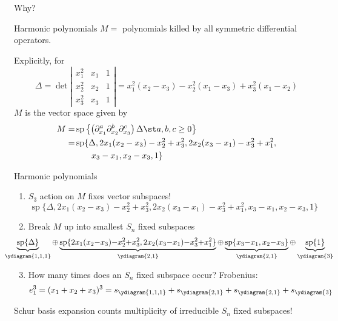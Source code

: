 \documentclass{beamer}
\renewcommand{\Span}{\operatorname{sp}}
\begin{document}
\begin{frame}{Why?}
  \begin{block}{Harmonic polynomials}
   \(M =\) polynomials killed by all symmetric differential
   operators.
  \end{block}\pause
  Explicitly, for
   \[
     \Delta = \det \left|
       \begin{matrix}
         x_1^2 & x_1 & 1\\
         x_2^2 & x_2 & 1\\
         x_3^2 & x_3 & 1
       \end{matrix}
     \right| = x_1^2(x_2-x_3) - x_2^2 (x_1 - x_3) + x_3^2(x_1-x_2)
   \]\pause
   \(M\) is the vector space given by\pause
   \begin{align*}
       M  = & \Span\left\{
\left(           \partial_{x_1}^a
           \partial_{x_2}^b  \partial_{x_3}^c
\right)         \Delta \st a,b,c \geq 0\right\} \\
        = & \Span\{\Delta, 2x_1(x_2-x_3)-x_2^2+x_3^2,
            2x_2(x_3-x_1)-x_3^2+x_1^2, \\
       & \phantom{\Span\{\}}x_3-x_1, x_2-x_3,1\}
   \end{align*}
\end{frame}
\begin{frame}{Harmonic polynomials}
  \begin{enumerate}
  \item \(S_3\) action on \(M\) fixes vector subspaces!
  \[
\Span\{\Delta, 2x_1(x_2-x_3)-x_2^2+x_3^2,
            2x_2(x_3-x_1)-x_3^2+x_1^2, 
       x_3-x_1, x_2-x_3,1\}
  \]\pause 
\item Break \(M\) up into smallest \(S_n\) fixed subspaces \pause
  \[
    \hspace{-2.9em}
    \scalebox{0.95}{\(
      \underbrace{\Span\{\Delta\}}_{\ydiagram{1,1,1}} {\oplus} \underbrace{\Span\{2x_1(x_2{-}x_3){-}x_2^2{+}x_3^2,
        2x_2(x_3{-}x_1){-}x_3^2{+}x_1^2\}}_{\ydiagram{2,1}} {\oplus}
      \underbrace{\Span\{x_3{-}x_1, x_2{-}x_3\}}_{\ydiagram{2,1}} {\oplus} \underbrace{\Span\{1\}}_{\ydiagram{3}}\)}
  \]\pause
  \item How many times does an \(S_n\) fixed subspace occur? \pause
    Frobenius: \pause
    \[
      e_1^3 = (x_1+x_2+x_3)^3 = s_{\ydiagram{1,1,1}} + s_{\ydiagram{2,1}} +
      s_{\ydiagram{2,1}} + s_{\ydiagram{3}}
    \]
  \end{enumerate}
  \pause
  Schur basis expansion counts multiplicity of irreducible \(S_n\)
  fixed subspaces!
\end{frame}
\end{document}
